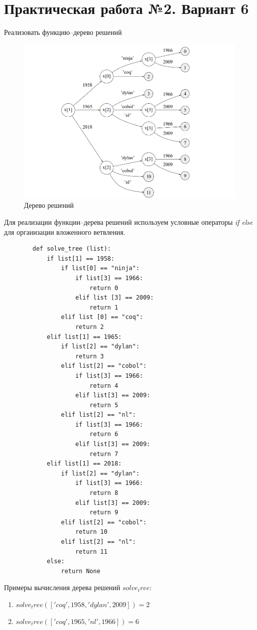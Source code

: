 \documentclass[a4paper,14pt]{extarticle}
\begin{document}
\section{Практическая работа №2. Вариант 6}
\begin{problem}
	Реализовать функцию--дерево решений
	\begin{figure}[h!]
		\begin{center}
			\includegraphics[width=\linewidth]{graph}
			\caption{Дерево решений}\label{pic:2.1}
		\end{center}	
	\end{figure}
\end{problem}

\begin{nonum}
	Для реализации функции--дерева решений используем условные операторы \textit {if else} для организации вложенного ветвления.
	\begin{lstlisting}
		def solve_tree (list):
			if list[1] == 1958:
				if list[0] == "ninja":
					if list[3] == 1966:
						return 0
					elif list [3] == 2009:
						return 1
				elif list [0] == "coq":
					return 2
			elif list[1] == 1965:
				if list[2] == "dylan":
					return 3
				elif list[2] == "cobol":
					if list[3] == 1966:
						return 4
					elif list[3] == 2009:
						return 5
				elif list[2] == "nl":
					if list[3] == 1966:
						return 6
					elif list[3] == 2009:
						return 7
			elif list[1] == 2018:
				if list[2] == "dylan":
					if list[3] == 1966:
						return 8
					elif list[3] == 2009:
						return 9
				elif list[2] == "cobol":
					return 10
				elif list[2] == "nl":
					return 11
			else:
				return None
	\end{lstlisting}
	\vspace{3ex}
	Примеры вычисления дерева решений $solve_tree$:
	\begin{enumerate}
		\item $solve_tree(['coq', 1958, 'dylan', 2009]) = 2$
		\item $solve_tree(['coq', 1965, 'nl', 1966]) = 6$
	\end{enumerate}
\end{nonum}
\end{document}
